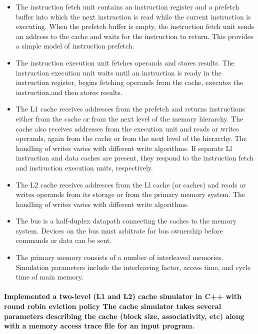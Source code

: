 \documentclass{article}
\begin{document}
  \begin{itemize}
      \item  The instruction fetch unit contains an instruction register and a
       prefetch buffer into which the next instruction is read while the current 
       instruction is executing. When the prefetch buffer is empty, the instruction 
       fetch unit sends an address to the cache and waits for the instruction to return.
        This provides a simple model of instruction prefetch.

        \item The instruction execution unit fetches operands and stores results. 
        The instruction execution unit waits until an instruction is ready in the 
        instruction register, begins fetching operands from the cache, executes the
         instruction,and then stores results. 

        \item The L1 cache receives addresses from the prefetch and returns 
        instructions either from the cache or from the next level of the memory
         hierarchy. The cache also receives addresses from the execution unit and reads 
         or writes operands, again from the cache or from the next level of the hierarchy. 
         The handling of writes varies with different write algorithms. If separate Ll 
         instruction and data caches are present, they respond to the instruction fetch 
         and instruction execution units, respectively. 

        \item The L2 cache receives addresses from the Ll cache (or caches) 
        and reads or writes operands from its storage or from the primary memory 
        system. The handling of writes varies with different write algorithms. 

        \item The bus is a half-duplex datapath connecting the caches 
        to the memory system. Devices on the bus must arbitrate for bus
         ownership before commands or data can be sent.

        \item The primary memory consists of a number of interleaved memories. 
        Simulation parameters include the interleaving factor, access time, and 
        cycle time of main memory. 

  \end{itemize}

  \paragraph{ Implemented a two-level (L1 and L2) cache simulator 
  in C++ with round robin eviction policy The cache simulator takes several
   parameters describing the cache (block size, associativity, etc) along with
    a memory access trace file for an input program. 
  }
\end{document}
